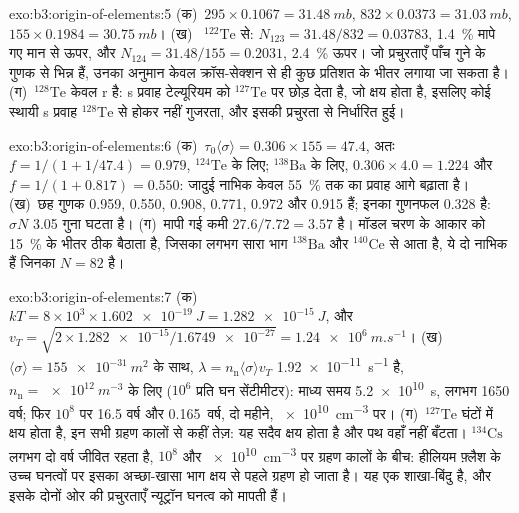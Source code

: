 \begin{solution}{exo:b3:origin-of-elements:5}
(क)~$295\times0.1067 = \qty{31.48}{mb}$, $832\times0.0373 =
\qty{31.03}{mb}$, $155\times0.1984 = \qty{30.75}{mb}$। (ख)~
$^{122}\mathrm{Te}$ से: $N_{123} = 31.48/832 = \num{0.03783}$, \qty{1.4}{\percent}
मापे गए मान से ऊपर, और $N_{124} = 31.48/155 = \num{0.2031}$,
\qty{2.4}{\percent} ऊपर। जो प्रचुरताएँ पाँच गुने के गुणक से भिन्न हैं,
उनका अनुमान केवल क्रॉस-सेक्शन से ही कुछ प्रतिशत के भीतर लगाया जा सकता है।
(ग)~$^{128}\mathrm{Te}$ केवल r है: s प्रवाह टेल्यूरियम को
$^{127}\mathrm{Te}$ पर छोड़ देता है, जो क्षय होता है, इसलिए कोई स्थायी s प्रवाह
$^{128}\mathrm{Te}$ से होकर नहीं गुजरता, और इसकी प्रचुरता  से निर्धारित हुई।
\end{solution}

\begin{solution}{exo:b3:origin-of-elements:6}
(क)~$\tau_0\langle\sigma\rangle = 0.306\times155 = 47.4$, अतः
$f = 1/(1 + 1/47.4) = \num{0.979}$, $^{124}\mathrm{Te}$ के लिए;
$^{138}\mathrm{Ba}$ के लिए, $0.306\times4.0 = 1.224$ और $f = 1/(1 + 0.817) =
\num{0.550}$: जादुई नाभिक केवल \qty{55}{\percent} तक का
प्रवाह आगे बढ़ाता है। (ख)~छह गुणक \num{0.959}, \num{0.550}, \num{0.908},
\num{0.771}, \num{0.972} और \num{0.915} हैं; इनका गुणनफल \num{0.328} है:
$\sigma N$ \num{3.05} गुना घटता है। (ग)~मापी गई कमी
$27.6/7.72 = 3.57$ है। मॉडल चरण के आकार को
\qty{15}{\percent} के भीतर ठीक बैठाता है, जिसका लगभग सारा भाग $^{138}\mathrm{Ba}$ और
$^{140}\mathrm{Ce}$ से आता है, ये दो नाभिक हैं जिनका $N = 82$ है।
\end{solution}

\begin{solution}{exo:b3:origin-of-elements:7}
(क)~$kT = 8\times10^3\times\qty{1.602e-19}{J} = \qty{1.282e-15}{J}$, और
$v_T = \sqrt{2\times\num{1.282e-15}/\num{1.6749e-27}} =
\qty{1.24e6}{m.s^{-1}}$। (ख)~$\langle\sigma\rangle =
\qty{155e-31}{m^2}$ के साथ, $\lambda = n_\mathrm{n}\langle\sigma\rangle v_T$
\qty{1.92e-11}{s^{-1}} है, $n_\mathrm{n} = \qty{e12}{m^{-3}}$ के लिए
($10^6$ प्रति घन सेंटीमीटर): माध्य समय \qty{5.2e10}{s}, लगभग
\num{1650} वर्ष; फिर $10^8$ पर \num{16.5} वर्ष और \num{0.165}~वर्ष,
दो महीने, \qty{e10}{cm^{-3}} पर। (ग)~$^{127}\mathrm{Te}$ घंटों में
क्षय होता है, इन सभी ग्रहण कालों से कहीं तेज़: यह सदैव क्षय होता है और
पथ वहाँ नहीं बँटता। $^{134}\mathrm{Cs}$ लगभग दो
वर्ष जीवित रहता है, $10^8$ और \qty{e10}{cm^{-3}} पर ग्रहण कालों के बीच:
हीलियम फ़्लैश के उच्च घनत्वों पर इसका अच्छा-खासा भाग
क्षय से पहले ग्रहण हो जाता है। यह एक शाखा-बिंदु है, और इसके दोनों ओर की प्रचुरताएँ
न्यूट्रॉन घनत्व को मापती हैं।
\end{solution}

